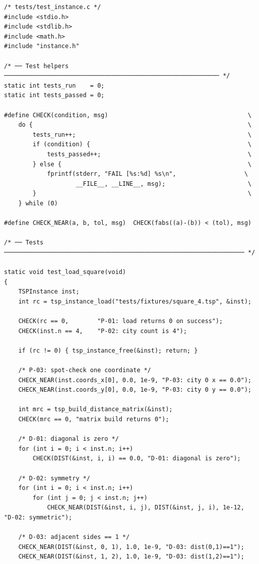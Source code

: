 \begin{lstlisting}[style=cstyle]
/* tests/test_instance.c */
#include <stdio.h>
#include <stdlib.h>
#include <math.h>
#include "instance.h"

/* ── Test helpers ──────────────────────────────────────────────────────────── */
static int tests_run    = 0;
static int tests_passed = 0;

#define CHECK(condition, msg)                                       \
    do {                                                            \
        tests_run++;                                                \
        if (condition) {                                            \
            tests_passed++;                                         \
        } else {                                                    \
            fprintf(stderr, "FAIL [%s:%d] %s\n",                   \
                    __FILE__, __LINE__, msg);                       \
        }                                                           \
    } while (0)

#define CHECK_NEAR(a, b, tol, msg)  CHECK(fabs((a)-(b)) < (tol), msg)

/* ── Tests ─────────────────────────────────────────────────────────────────── */

static void test_load_square(void)
{
    TSPInstance inst;
    int rc = tsp_instance_load("tests/fixtures/square_4.tsp", &inst);

    CHECK(rc == 0,        "P-01: load returns 0 on success");
    CHECK(inst.n == 4,    "P-02: city count is 4");

    if (rc != 0) { tsp_instance_free(&inst); return; }

    /* P-03: spot-check one coordinate */
    CHECK_NEAR(inst.coords_x[0], 0.0, 1e-9, "P-03: city 0 x == 0.0");
    CHECK_NEAR(inst.coords_y[0], 0.0, 1e-9, "P-03: city 0 y == 0.0");

    int mrc = tsp_build_distance_matrix(&inst);
    CHECK(mrc == 0, "matrix build returns 0");

    /* D-01: diagonal is zero */
    for (int i = 0; i < inst.n; i++)
        CHECK(DIST(&inst, i, i) == 0.0, "D-01: diagonal is zero");

    /* D-02: symmetry */
    for (int i = 0; i < inst.n; i++)
        for (int j = 0; j < inst.n; j++)
            CHECK_NEAR(DIST(&inst, i, j), DIST(&inst, j, i), 1e-12, "D-02: symmetric");

    /* D-03: adjacent sides == 1 */
    CHECK_NEAR(DIST(&inst, 0, 1), 1.0, 1e-9, "D-03: dist(0,1)==1");
    CHECK_NEAR(DIST(&inst, 1, 2), 1.0, 1e-9, "D-03: dist(1,2)==1");


\end{lstlisting}
